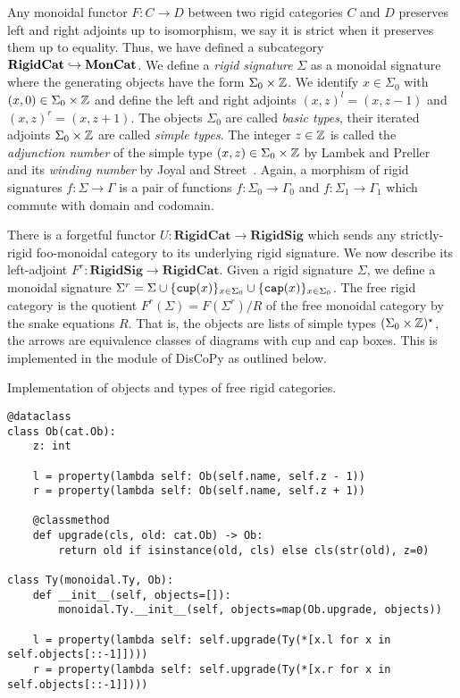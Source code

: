Any monoidal functor $F : C \to D$ between two rigid categories $C$ and $D$ preserves left and right adjoints up to isomorphism, we say it is strict when it preserves them up to equality.
Thus, we have defined a subcategory $\mathbf{RigidCat} \hookrightarrow \mathbf{MonCat}$.
We define a \emph{rigid signature} $\Sigma$ as a monoidal signature where the generating objects have the form $\Sigma_0 \times \mathbb{Z}$.
We identify $x \in \Sigma_0$ with $(x, 0) \in \Sigma_0 \times \mathbb{Z}$ and define the left and right adjoints $(x, z)^l = (x, z - 1)$ and $(x, z)^r = (x, z + 1)$.
The objects $\Sigma_0$ are called \emph{basic types}, their iterated adjoints $\Sigma_0 \times \mathbb{Z}$ are called \emph{simple types}.
The integer $z \in \mathbb{Z}$ is called the \emph{adjunction number} of the simple type $(x, z) \in \Sigma_0 \times \mathbb{Z}$ by Lambek and Preller~\cite{PrellerLambek07} and its \emph{winding number} by Joyal and Street~\cite{JoyalStreet88}.
Again, a morphism of rigid signatures $f : \Sigma \to \Gamma$ is a pair of functions $f : \Sigma_0 \to \Gamma_0$ and $f : \Sigma_1 \to \Gamma_1$ which commute with domain and codomain.

There is a forgetful functor $U : \mathbf{RigidCat} \to \mathbf{RigidSig}$ which sends any strictly-rigid foo-monoidal category to its underlying rigid signature.
We now describe its left-adjoint $F^r : \mathbf{RigidSig} \to \mathbf{RigidCat}$.
Given a rigid signature $\Sigma$, we define a monoidal signature $\Sigma^r = \Sigma \cup \{ \mathtt{cup} (x) \}_{x \in \Sigma_0} \cup \{ \mathtt{cap} (x) \}_{x \in \Sigma_0}$.
The free rigid category is the quotient $F^r(\Sigma) = F(\Sigma^r) / R$ of the free monoidal category by the snake equations $R$.
That is, the objects are lists of simple types $(\Sigma_0 \times \mathbb{Z})^\star$, the arrows are equivalence classes of diagrams with cup and cap boxes.
This is implemented in the  module of DisCoPy as outlined below.

\begin{python}
{\normalfont Implementation of objects and types of free rigid categories.}

\begin{verbatim}
@dataclass
class Ob(cat.Ob):
    z: int

    l = property(lambda self: Ob(self.name, self.z - 1))
    r = property(lambda self: Ob(self.name, self.z + 1))

    @classmethod
    def upgrade(cls, old: cat.Ob) -> Ob:
        return old if isinstance(old, cls) else cls(str(old), z=0)

class Ty(monoidal.Ty, Ob):
    def __init__(self, objects=[]):
        monoidal.Ty.__init__(self, objects=map(Ob.upgrade, objects))

    l = property(lambda self: self.upgrade(Ty(*[x.l for x in self.objects[::-1]])))
    r = property(lambda self: self.upgrade(Ty(*[x.r for x in self.objects[::-1]])))
\end{verbatim}
\end{python}

